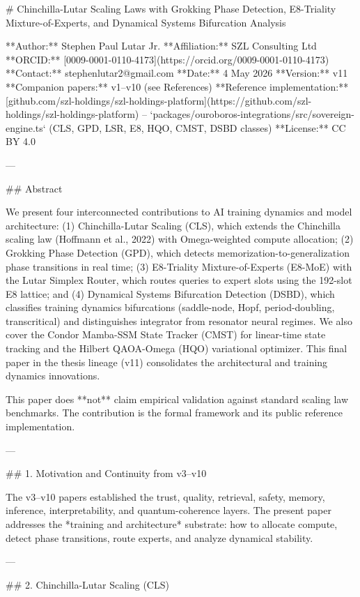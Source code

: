 # Chinchilla-Lutar Scaling Laws with Grokking Phase Detection, E8-Triality Mixture-of-Experts, and Dynamical Systems Bifurcation Analysis

**Author:** Stephen Paul Lutar Jr.
**Affiliation:** SZL Consulting Ltd
**ORCID:** [0009-0001-0110-4173](https://orcid.org/0009-0001-0110-4173)
**Contact:** stephenlutar2@gmail.com
**Date:** 4 May 2026
**Version:** v11
**Companion papers:** v1--v10 (see References)
**Reference implementation:** [github.com/szl-holdings/szl-holdings-platform](https://github.com/szl-holdings/szl-holdings-platform) -- `packages/ouroboros-integrations/src/sovereign-engine.ts` (CLS, GPD, LSR, E8, HQO, CMST, DSBD classes)
**License:** CC BY 4.0

---

## Abstract

We present four interconnected contributions to AI training dynamics and model architecture: (1) Chinchilla-Lutar Scaling (CLS), which extends the Chinchilla scaling law (Hoffmann et al., 2022) with Omega-weighted compute allocation; (2) Grokking Phase Detection (GPD), which detects memorization-to-generalization phase transitions in real time; (3) E8-Triality Mixture-of-Experts (E8-MoE) with the Lutar Simplex Router, which routes queries to expert slots using the 192-slot E8 lattice; and (4) Dynamical Systems Bifurcation Detection (DSBD), which classifies training dynamics bifurcations (saddle-node, Hopf, period-doubling, transcritical) and distinguishes integrator from resonator neural regimes. We also cover the Condor Mamba-SSM State Tracker (CMST) for linear-time state tracking and the Hilbert QAOA-Omega (HQO) variational optimizer. This final paper in the thesis lineage (v11) consolidates the architectural and training dynamics innovations.

This paper does **not** claim empirical validation against standard scaling law benchmarks. The contribution is the formal framework and its public reference implementation.

---

## 1. Motivation and Continuity from v3--v10

The v3--v10 papers established the trust, quality, retrieval, safety, memory, inference, interpretability, and quantum-coherence layers. The present paper addresses the *training and architecture* substrate: how to allocate compute, detect phase transitions, route experts, and analyze dynamical stability.

---

## 2. Chinchilla-Lutar Scaling (CLS)

